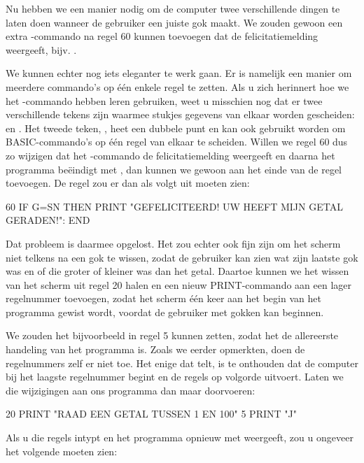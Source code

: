 Nu hebben we een manier nodig om de computer twee verschillende dingen te laten doen wanneer de gebruiker een juiste gok maakt. We zouden gewoon een extra -commando na regel 60 kunnen toevoegen dat de felicitatiemelding weergeeft, bijv. .

We kunnen echter nog iets eleganter te werk gaan. Er is namelijk een manier om meerdere commando's op één enkele regel te zetten. Als u zich herinnert hoe we het -commando hebben leren gebruiken, weet u misschien nog dat er twee verschillende tekens zijn waarmee stukjes gegevens van elkaar worden gescheiden: \stw{,} en \stw{:}. Het tweede teken, \stw{:}, heet een dubbele punt en kan ook gebruikt worden om BASIC-commando's op één regel van elkaar te scheiden. Willen we regel 60 dus zo wijzigen dat het -commando de felicitatiemelding weergeeft en daarna het programma beëindigt met , dan kunnen we gewoon  aan het einde van de regel toevoegen. De regel zou er dan als volgt uit moeten zien:

\begin{screencode}
  60 IF G=SN THEN PRINT "GEFELICITEERD! UW HEEFT MIJN GETAL GERADEN!": END
\end{screencode}

Dat probleem is daarmee opgelost. Het zou echter ook fijn zijn om het scherm niet telkens na een gok te wissen, zodat de gebruiker kan zien wat zijn laatste gok was en of die groter of kleiner was dan het getal. Daartoe kunnen we het wissen van het scherm uit regel 20 halen en een nieuw PRINT-commando aan een lager regelnummer toevoegen, zodat het scherm één keer aan het begin van het programma gewist wordt, voordat de gebruiker met gokken kan beginnen.

\needspace{2cm}
We zouden het bijvoorbeeld in regel 5 kunnen zetten, zodat het de allereerste handeling van het programma is. Zoals we eerder opmerkten, doen de regelnummers zelf er niet toe. Het enige dat telt, is te onthouden dat de computer bij het laagste regelnummer begint en de regels op volgorde uitvoert. Laten we die wijzigingen aan ons programma dan maar doorvoeren:

\begin{screencode}
  20 PRINT "RAAD EEN GETAL TUSSEN 1 EN 100"
  5 PRINT "J"
\end{screencode}

\needspace{4cm}
Als u die regels intypt en het programma opnieuw met  weergeeft, zou u ongeveer het volgende moeten zien:

